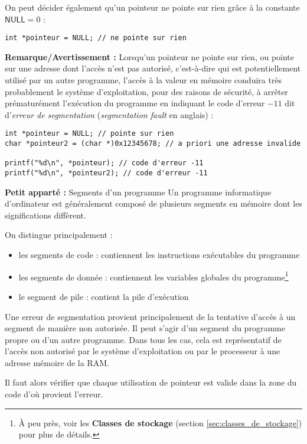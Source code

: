\documentclass[../../../main.tex]{subfiles}
\begin{document}
On peut décider également qu'un pointeur ne pointe sur rien grâce à la constante $\textsf{NULL} = 0$ :
\begin{verbatim}
int *pointeur = NULL; // ne pointe sur rien
\end{verbatim}
\textbf{Remarque/Avertissement :} Lorsqu'un pointeur ne pointe sur rien, ou pointe sur une adresse dont l'accès n'est pas autorisé, c'est-à-dire qui est potentiellement utilisé par un autre programme, l'accès à la valeur en mémoire conduira très probablement le système d'exploitation, pour des raisons de sécurité, à arrêter prématurément l'exécution du programme en indiquant le code d'erreur $-11$ dit d'\textit{erreur de segmentation} (\textit{segmentation fault} en anglais) :
\begin{verbatim}
int *pointeur = NULL; // pointe sur rien
char *pointeur2 = (char *)0x12345678; // a priori une adresse invalide 

printf("%d\n", *pointeur); // code d'erreur -11
printf("%d\n", *pointeur2); // code d'erreur -11
\end{verbatim}
\begin{minitelbasicbox}{\textbf{Petit apparté :} Segments d'un programme}
Un programme informatique d'ordinateur est généralement composé de plusieurs segments en mémoire dont les significations diffèrent.

On distingue principalement :
\begin{itemize}
	\item les segments de code : contiennent les instructions exécutables du programme
	\item les segments de donnée : contiennent les variables globales du programme\footnote{À peu près, voir les \textbf{Classes de stockage} (section \ref{sec:classes_de_stockage}) pour plus de détails.}
	\item le segment de pile : contient la pile d'exécution
\end{itemize}
Une erreur de segmentation provient principalement de la tentative d'accès à un segment de manière non autorisée. Il peut s'agir d'un segment du programme propre ou d'un autre programme. Dans tous les cas, cela est représentatif de l'accès non autorisé par le système d'exploitation ou par le processeur à une adresse mémoire de la RAM.

Il faut alors vérifier que chaque utilisation de pointeur est valide dans la zone du code d'où provient l'erreur.
\end{minitelbasicbox}
\end{document}
